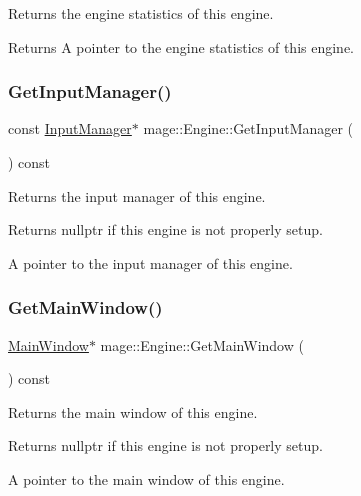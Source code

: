 Returns the engine statistics of this engine.

\begin{DoxyReturn}{Returns}
A pointer to the engine statistics of this engine. 
\end{DoxyReturn}
\hypertarget{classmage_1_1_engine_a9e8de859024c2b51d9b20ce498d6c07b}{}\label{classmage_1_1_engine_a9e8de859024c2b51d9b20ce498d6c07b} 
\subsubsection{\texorpdfstring{Get\+Input\+Manager()}{GetInputManager()}}
{\footnotesize\ttfamily const \hyperlink{classmage_1_1_input_manager}{Input\+Manager}$\ast$ mage\+::\+Engine\+::\+Get\+Input\+Manager (\begin{DoxyParamCaption}{ }\end{DoxyParamCaption}) const\hspace{0.3cm}{\ttfamily [noexcept]}}

Returns the input manager of this engine.

\begin{DoxyReturn}{Returns}
{\ttfamily nullptr} if this engine is not properly setup. 

A pointer to the input manager of this engine. 
\end{DoxyReturn}
\hypertarget{classmage_1_1_engine_a56e7cbf3a781bd519ed79f0a75a9ce86}{}\label{classmage_1_1_engine_a56e7cbf3a781bd519ed79f0a75a9ce86} 
\subsubsection{\texorpdfstring{Get\+Main\+Window()}{GetMainWindow()}}
{\footnotesize\ttfamily \hyperlink{classmage_1_1_main_window}{Main\+Window}$\ast$ mage\+::\+Engine\+::\+Get\+Main\+Window (\begin{DoxyParamCaption}{ }\end{DoxyParamCaption}) const\hspace{0.3cm}{\ttfamily [noexcept]}}

Returns the main window of this engine.

\begin{DoxyReturn}{Returns}
{\ttfamily nullptr} if this engine is not properly setup. 

A pointer to the main window of this engine. 
\end{DoxyReturn}
\hypertarget{classmage_1_1_engine_ae3d894eacf94cdf416d95c57e45b4836}{}\label{classmage_1_1_engine_ae3d894eacf94cdf416d95c57e45b4836} 
